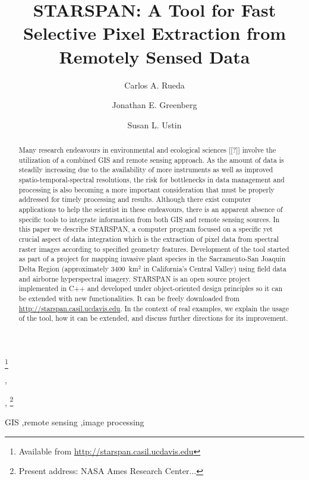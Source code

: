 \documentclass{elsart}
\begin{document}
\begin{frontmatter}

\title{STARSPAN: 
A Tool for Fast Selective Pixel Extraction 
from Remotely Sensed Data}
\thanks[label1]{Available from \url{http://starspan.casil.ucdavis.edu}}

\author{Carlos A. Rueda},
\author{Jonathan E. Greenberg},
\thanks[greenberg]{Present address: NASA Ames Research Center...}
\author{Susan L. Ustin}

\address{Center for Spatial Technologies and Remote Sensing (CSTARS).
The Barn. University of California, Davis. One Shields Avenue, Davis, CA 95616}

\begin{abstract}
	
	Many research endeavours in environmental and ecological
	sciences [[?]] involve the utilization of a combined GIS
	and remote sensing approach. As the amount of data is
	steadily increasing due to the availability of more
	instruments as well as improved spatio-temporal-spectral
	resolutions, the risk for bottlenecks in data management
	and processing is also becoming a more important
	consideration that must be properly addressed for timely
	processing and results. Although there exist computer
	applications to help the scientist in these endeavours,
	there is an apparent absence of specific tools to
	integrate information from both GIS and remote sensing
	sources. In this paper we describe STARSPAN, a computer
	program focused on a specific yet crucial aspect of data
	integration which is the extraction of pixel data from
	spectral raster images according to specified geometry
	features. Development of the tool started as part of a
	project for mapping invasive plant species in the
	Sacramento-San Joaquin Delta Region (approximately
	$3400$~km$^2$ in California's Central Valley) using
	field data and airborne hyperspectral imagery. STARSPAN
	is an open source project implemented in C++ and
	developed under object-oriented design principles so it
	can be extended with new functionalities. It can be
	freely downloaded from
	\url{http://starspan.casil.ucdavis.edu}. In the context
	of real examples, we explain the usage of the tool, how
	it can be extended, and discuss further directions for
	its improvement.
	
	
\end{abstract}

\begin{keyword}
GIS \sep remote sensing \sep image processing
\end{keyword}

\end{frontmatter}
\end{document}
